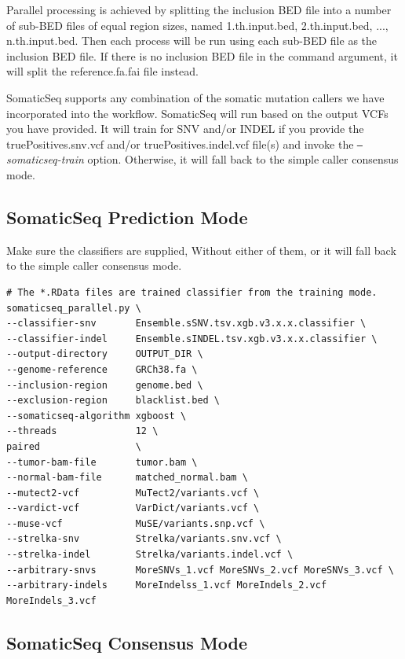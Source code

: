 \documentclass[10pt,letterpaper]{article}
\begin{document}
\begin{sloppypar}
Parallel processing is achieved by splitting the inclusion BED file into a number of sub-BED files of equal region sizes, named 1.th.input.bed, 2.th.input.bed, ..., n.th.input.bed. Then each process will be run using each sub-BED file as the inclusion BED file. If there is no inclusion BED file in the command argument, it will split the reference.fa.fai file instead. 

SomaticSeq supports any combination of the somatic mutation callers we have incorporated into the workflow. SomaticSeq will run based on the output VCFs you have provided. It will train for SNV and/or INDEL if you provide the truePositives.snv.vcf and/or truePositives.indel.vcf file(s) and invoke the \textit{\texttt{--}somaticseq-train} option. Otherwise, it will fall back to the simple caller consensus mode.




\subsection{SomaticSeq Prediction Mode} \label{somaticseq_prediction}

Make sure the classifiers are supplied, Without either of them, or it will fall back to the simple caller consensus mode.

\begin{lstlisting}
# The *.RData files are trained classifier from the training mode.
somaticseq_parallel.py \
--classifier-snv       Ensemble.sSNV.tsv.xgb.v3.x.x.classifier \
--classifier-indel     Ensemble.sINDEL.tsv.xgb.v3.x.x.classifier \
--output-directory     OUTPUT_DIR \
--genome-reference     GRCh38.fa \
--inclusion-region     genome.bed \
--exclusion-region     blacklist.bed \
--somaticseq-algorithm xgboost \
--threads              12 \
paired                 \
--tumor-bam-file       tumor.bam \
--normal-bam-file      matched_normal.bam \
--mutect2-vcf          MuTect2/variants.vcf \
--vardict-vcf          VarDict/variants.vcf \
--muse-vcf             MuSE/variants.snp.vcf \
--strelka-snv          Strelka/variants.snv.vcf \
--strelka-indel        Strelka/variants.indel.vcf \
--arbitrary-snvs       MoreSNVs_1.vcf MoreSNVs_2.vcf MoreSNVs_3.vcf \
--arbitrary-indels     MoreIndelss_1.vcf MoreIndels_2.vcf MoreIndels_3.vcf
\end{lstlisting}



\subsection{SomaticSeq Consensus Mode} \label{somaticseq_default_mode}


\end{sloppypar}
\end{document}
